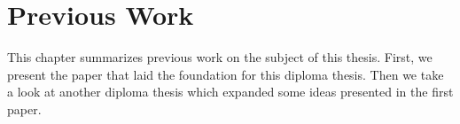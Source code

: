 \chapter{Previous Work}
\label{previous}

This chapter summarizes previous work on the subject of this thesis.
First, we present the paper that laid the foundation for this diploma thesis.
Then we take a look at another diploma thesis which expanded some ideas presented in the first paper.



